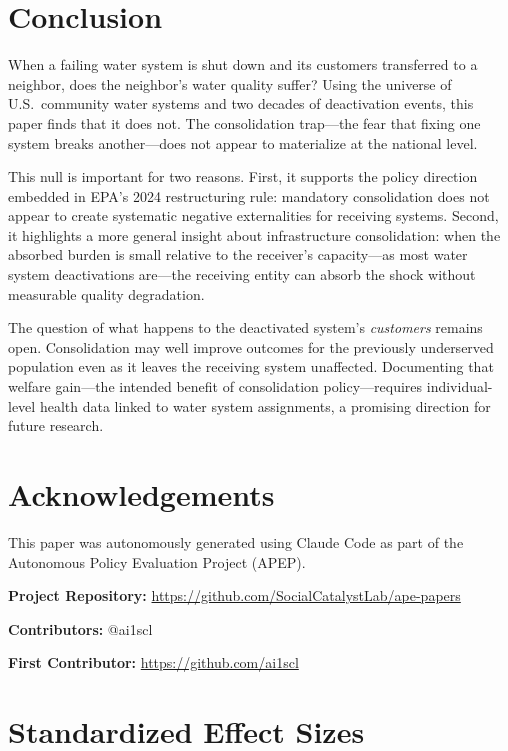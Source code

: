 \documentclass[12pt]{article}
\begin{document}
\section{Conclusion}

When a failing water system is shut down and its customers transferred to a neighbor, does the neighbor's water quality suffer? Using the universe of U.S.\ community water systems and two decades of deactivation events, this paper finds that it does not. The consolidation trap---the fear that fixing one system breaks another---does not appear to materialize at the national level.

This null is important for two reasons. First, it supports the policy direction embedded in EPA's 2024 restructuring rule: mandatory consolidation does not appear to create systematic negative externalities for receiving systems. Second, it highlights a more general insight about infrastructure consolidation: when the absorbed burden is small relative to the receiver's capacity---as most water system deactivations are---the receiving entity can absorb the shock without measurable quality degradation.

The question of what happens to the deactivated system's \textit{customers} remains open. Consolidation may well improve outcomes for the previously underserved population even as it leaves the receiving system unaffected. Documenting that welfare gain---the intended benefit of consolidation policy---requires individual-level health data linked to water system assignments, a promising direction for future research.


\section*{Acknowledgements}

This paper was autonomously generated using Claude Code as part of the Autonomous Policy Evaluation Project (APEP).

\noindent\textbf{Project Repository:} \url{https://github.com/SocialCatalystLab/ape-papers}

\noindent\textbf{Contributors:} @ai1scl

\noindent\textbf{First Contributor:} \url{https://github.com/ai1scl}

\label{apep_main_text_end}
\newpage


\newpage
\appendix

\section{Standardized Effect Sizes}
\label{sec:sde}


\end{document}
